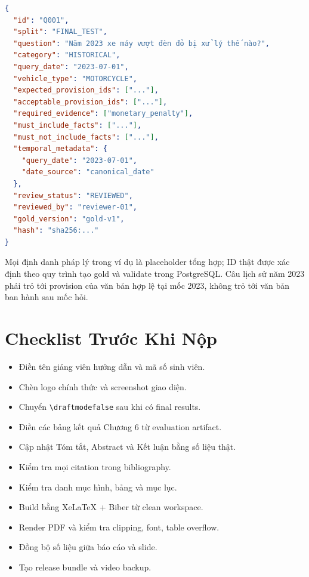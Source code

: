\documentclass[a4paper,12pt]{extreport}
\newcommand{\code}[1]{\texttt{#1}}
\begin{document}
\begin{lstlisting}[language=json,caption={Gold record schema rút gọn}]
{
  "id": "Q001",
  "split": "FINAL_TEST",
  "question": "Năm 2023 xe máy vượt đèn đỏ bị xử lý thế nào?",
  "category": "HISTORICAL",
  "query_date": "2023-07-01",
  "vehicle_type": "MOTORCYCLE",
  "expected_provision_ids": ["..."],
  "acceptable_provision_ids": ["..."],
  "required_evidence": ["monetary_penalty"],
  "must_include_facts": ["..."],
  "must_not_include_facts": ["..."],
  "temporal_metadata": {
    "query_date": "2023-07-01",
    "date_source": "canonical_date"
  },
  "review_status": "REVIEWED",
  "reviewed_by": "reviewer-01",
  "gold_version": "gold-v1",
  "hash": "sha256:..."
}
\end{lstlisting}

Mọi định danh pháp lý trong ví dụ là placeholder tổng hợp; ID thật được xác định theo quy trình tạo gold và validate trong PostgreSQL. Câu lịch sử năm 2023 phải trỏ tới provision của văn bản hợp lệ tại mốc 2023, không trỏ tới văn bản ban hành sau mốc hỏi.

\chapter{Checklist Trước Khi Nộp}

\begin{itemize}
  \item[$\square$] Điền tên giảng viên hướng dẫn và mã số sinh viên.
  \item[$\square$] Chèn logo chính thức và screenshot giao diện.
  \item[$\square$] Chuyển \code{\textbackslash draftmodefalse} sau khi có final results.
  \item[$\square$] Điền các bảng kết quả Chương 6 từ evaluation artifact.
  \item[$\square$] Cập nhật Tóm tắt, Abstract và Kết luận bằng số liệu thật.
  \item[$\square$] Kiểm tra mọi citation trong bibliography.
  \item[$\square$] Kiểm tra danh mục hình, bảng và mục lục.
  \item[$\square$] Build bằng XeLaTeX + Biber từ clean workspace.
  \item[$\square$] Render PDF và kiểm tra clipping, font, table overflow.
  \item[$\square$] Đồng bộ số liệu giữa báo cáo và slide.
  \item[$\square$] Tạo release bundle và video backup.
\end{itemize}
\end{document}
